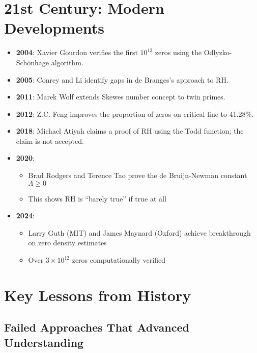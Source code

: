 \section*{21st Century: Modern Developments}

\begin{itemize}
\item \textbf{2004}: Xavier Gourdon verifies the first $10^{13}$ zeros using the Odlyzko-Sch\"onhage algorithm.

\item \textbf{2005}: Conrey and Li identify gaps in de Branges's approach to RH.

\item \textbf{2011}: Marek Wolf extends Skewes number concept to twin primes.

\item \textbf{2012}: Z.C. Feng improves the proportion of zeros on critical line to 41.28\%.

\item \textbf{2018}: Michael Atiyah claims a proof of RH using the Todd function; the claim is not accepted.

\item \textbf{2020}: 
  \begin{itemize}
  \item Brad Rodgers and Terence Tao prove the de Bruijn-Newman constant $\Lambda \geq 0$
  \item This shows RH is ``barely true'' if true at all
  \end{itemize}

\item \textbf{2024}: 
  \begin{itemize}
  \item Larry Guth (MIT) and James Maynard (Oxford) achieve breakthrough on zero density estimates
  \item Over $3 \times 10^{12}$ zeros computationally verified
  \end{itemize}
\end{itemize}

\section*{Key Lessons from History}

\subsection*{Failed Approaches That Advanced Understanding}

